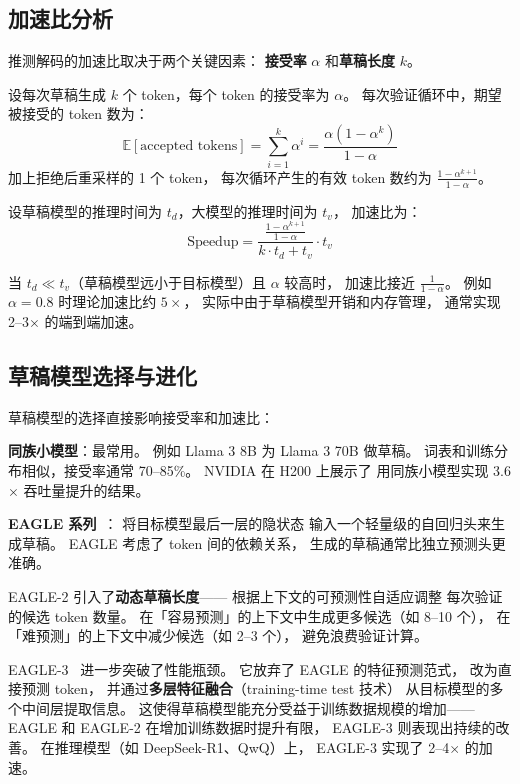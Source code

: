 \subsection{加速比分析}

推测解码的加速比取决于两个关键因素：
\textbf{接受率} $\alpha$ 和\textbf{草稿长度} $k$。

设每次草稿生成 $k$ 个 token，每个 token 的接受率为 $\alpha$。
每次验证循环中，期望被接受的 token 数为：
\begin{equation}
  \mathbb{E}[\text{accepted tokens}] = \sum_{i=1}^{k} \alpha^i = \frac{\alpha(1 - \alpha^k)}{1 - \alpha}
\end{equation}
加上拒绝后重采样的 1 个 token，
每次循环产生的有效 token 数约为 $\frac{1 - \alpha^{k+1}}{1 - \alpha}$。

设草稿模型的推理时间为 $t_d$，大模型的推理时间为 $t_v$，
加速比为：
\begin{equation}
  \text{Speedup} = \frac{\frac{1 - \alpha^{k+1}}{1 - \alpha}}{k \cdot t_d + t_v} \cdot t_v
\end{equation}

当 $t_d \ll t_v$（草稿模型远小于目标模型）且 $\alpha$ 较高时，
加速比接近 $\frac{1}{1-\alpha}$。
例如 $\alpha = 0.8$ 时理论加速比约 $5\times$，
实际中由于草稿模型开销和内存管理，
通常实现 2--3$\times$ 的端到端加速。

\subsection{草稿模型选择与进化}

草稿模型的选择直接影响接受率和加速比：

\textbf{同族小模型}：最常用。
例如 Llama 3 8B 为 Llama 3 70B 做草稿。
词表和训练分布相似，接受率通常 70--85\%。
NVIDIA 在 H200 上展示了
用同族小模型实现 3.6$\times$ 吞吐量提升的结果。

\textbf{EAGLE 系列}~\cite{li2024eagle}：
将目标模型最后一层的隐状态
输入一个轻量级的自回归头来生成草稿。
EAGLE 考虑了 token 间的依赖关系，
生成的草稿通常比独立预测头更准确。

EAGLE-2 引入了\textbf{动态草稿长度}——
根据上下文的可预测性自适应调整
每次验证的候选 token 数量。
在「容易预测」的上下文中生成更多候选（如 8--10 个），
在「难预测」的上下文中减少候选（如 2--3 个），
避免浪费验证计算。

EAGLE-3~\cite{li2025eagle3} 进一步突破了性能瓶颈。
它放弃了 EAGLE 的特征预测范式，
改为直接预测 token，
并通过\textbf{多层特征融合}（training-time test 技术）
从目标模型的多个中间层提取信息。
这使得草稿模型能充分受益于训练数据规模的增加——
EAGLE 和 EAGLE-2 在增加训练数据时提升有限，
EAGLE-3 则表现出持续的改善。
在推理模型（如 DeepSeek-R1、QwQ）上，
EAGLE-3 实现了 2--4$\times$ 的加速。

